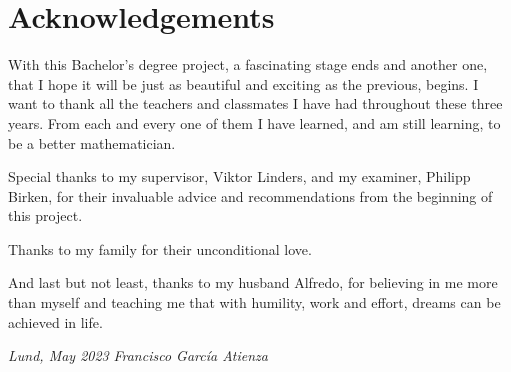 
\chapter*{Acknowledgements}

		


With this Bachelor's degree project, a fascinating stage ends and another one, that I hope it will be just as beautiful and exciting as the previous, begins. I want to thank all the teachers and classmates I have had throughout these three years. From each and every one of them I have learned, and am still learning, to be a better mathematician.

Special thanks to my supervisor, Viktor Linders, and my examiner, Philipp Birken, for their invaluable advice and recommendations from the beginning of this project.

Thanks to my family for their unconditional love.

And last but not least, thanks to my husband Alfredo, for believing in me more than myself and teaching me that with humility, work and effort, dreams can be achieved in life.

\addvspace{1.3cm}

\textit{Lund, May 2023} \hfill \textit{Francisco García Atienza}









